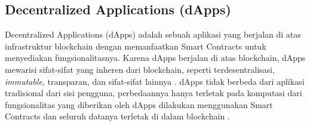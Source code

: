 \subsection{Decentralized Applications (dApps)}
\label{subsec:dapps}

Decentralized Applications (dApps) adalah sebuah aplikasi yang berjalan di atas infrastruktur blockchain dengan memanfaatkan Smart Contracts untuk menyediakan fungsionalitasnya. Karena dApps berjalan di atas blockchain, dApps mewarisi sifat-sifat yang inheren dari blockchain, seperti terdesentralisasi, \textit{immutable}, transparan, dan sifat-sifat lainnya \parencite{investopedia2024}. dApps tidak berbeda dari aplikasi tradisional dari sisi pengguna, perbedaannya hanya terletak pada komputasi dari fungsionalitas yang diberikan oleh dApps dilakukan menggunakan Smart Contracts dan seluruh datanya terletak di dalam blockchain \parencite{metcalfe2020ethereum}.

